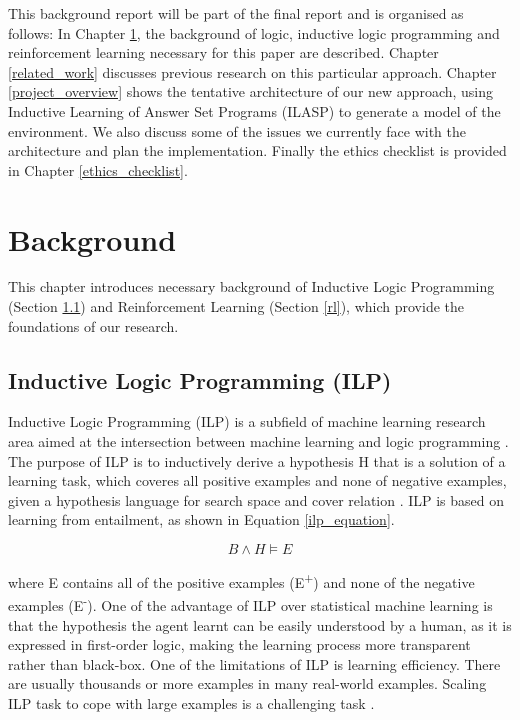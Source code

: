 \documentclass[12pt,twoside]{report}
\begin{document}
This background report will be part of the final report and is organised as follows: In Chapter \ref{background}, the background of logic, inductive logic programming and reinforcement learning necessary for this paper are described. Chapter \ref{related_work} discusses previous research on this particular approach. Chapter \ref{project_overview} shows the tentative architecture of our new approach, using Inductive Learning of Answer Set Programs (ILASP) to generate a model of the environment. We also discuss some of the issues we currently face with the architecture and plan the implementation. Finally the ethics checklist is provided in Chapter \ref{ethics_checklist}.

\chapter{Background}
\label{background}

This chapter introduces necessary background of Inductive Logic Programming (Section \ref{ilp}) and Reinforcement Learning (Section \ref{rl}), which provide the foundations of our research.

\section{Inductive Logic Programming (ILP)}
\label{ilp}

Inductive Logic Programming (ILP) is a subfield of machine learning research area aimed at the intersection between machine learning and logic programming \cite{Muggleton1991}. The purpose of ILP is to inductively derive a hypothesis H that is a solution of a learning task, which coveres all positive examples and none of negative examples, given a hypothesis language for search space and cover relation \cite{DeRaedt1997}. ILP is based on learning from entailment, as shown in Equation \ref{ilp_equation}.

\begin{equation}
B \wedge H \models E
\end{equation}
\label{ilp_equation}

where E contains all of the positive examples (E\textsuperscript{+}) and none of the negative examples (E\textsuperscript{-}).
One of the advantage of ILP over statistical machine learning is that the hypothesis the agent learnt can be easily understood by a human, as it is expressed in first-order logic, making the learning process more transparent rather than black-box.
One of the limitations of ILP is learning efficiency. There are usually thousands or more examples in many real-world examples. Scaling ILP task to cope with large examples is a challenging task \cite{Muggleton1993}.
\end{document}

